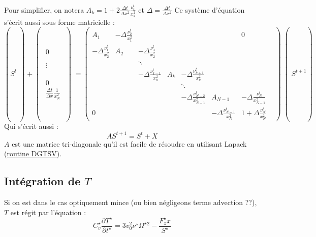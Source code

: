 Pour simplifier, on notera $A_k = 1 + 2 \frac{\Delta t}{\Delta x^2}\frac{\nu_k^t}{x_k^2}$ et $\Delta = \frac{\Delta t}{\Delta x^2}$
Ce système d'équation s'écrit aussi sous forme matricielle :
\begin{equation}
  \left(S^t\middle) + 
  \middle(\begin{matrix}
    0 \\
    \\
    \\
    \vdots \\
    \\
    \\
    \\
    0 \\
    \frac{\Delta t}{\Delta x}\frac{1}{x_N^2}
  \end{matrix}\middle)
  =
  \begin{pmatrix}
A_1                            & -\Delta\frac{\nu_{2}^t}{x_1^2} &  & & & & 0\\
-\Delta \frac{\nu_{1}^t}{x_2^2} & A_2                           & -\Delta\frac{\nu_{3}^t}{x_2^2} & & & &\\
    &        & \ddots                          &  & & & &\\
    &        & -\Delta \frac{\nu_{k-1}^t}{x_k^2} & A_k    & -\Delta \frac{\nu_{k+1}^t}{x_k^2} & &\\
    &        &                                 & & \ddots                          & & \\
    & & & & -\Delta \frac{\nu_{N-2}^t}{x_{N-1}^2} & A_{N-1} & -\Delta \frac{\nu_{N}^t}{x_{N-1}^2}\\
    0 & & & & & -\Delta \frac{\nu_{N-1}^t}{x_N^2} & 1 + \Delta \frac{\nu_N^t}{x_N^2}
  \end{pmatrix} \middle(S^{t+1}\right)
\end{equation}
Qui s'écrit aussi :
\begin{equation}
  AS^{t+1} = S^t + X 
\end{equation}
$A$ est une matrice tri-diagonale qu'il est facile de résoudre en utilisant Lapack (\href{http://www.netlib.org/lapack/explore-html/d4/d62/group__double_g_tsolve.html#ga2bf93f2ddefa5e671866eb2191dc19d4}{routine DGTSV}).

\subsection{Intégration de $T$}
\label{subsec:integration_T}

Si on est dans le cas optiquement mince (ou bien négligeons terme advection ??), $T$ est régit par l'équation :
\begin{equation}
  C_v^\star \frac{\partial T^\star}{\partial t^\star} = 3v_0^2\nu^\star \Omega^\star{}^2 - \frac{F_z^\star x}{S^\star}
\end{equation}

